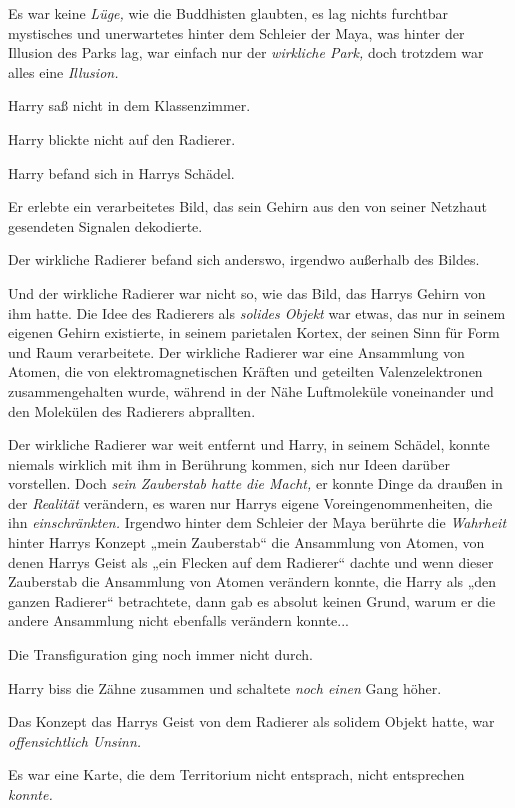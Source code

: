 {Es war keine \emph{Lüge,} wie die Buddhisten glaubten, es lag nichts furchtbar mystisches und unerwartetes hinter dem Schleier der Maya, was hinter der Illusion des Parks lag, war einfach nur der \emph{wirkliche Park,} doch trotzdem war alles eine \emph{Illusion.}

Harry saß nicht in dem Klassenzimmer.

Harry blickte nicht auf den Radierer.

Harry befand sich in Harrys Schädel.

Er erlebte ein verarbeitetes Bild, das sein Gehirn aus den von seiner Netzhaut gesendeten Signalen dekodierte.

Der wirkliche Radierer befand sich anderswo, irgendwo außerhalb des Bildes.

Und der wirkliche Radierer war nicht so, wie das Bild, das Harrys Gehirn von ihm hatte. Die Idee des Radierers als \emph{solides Objekt} war etwas, das nur in seinem eigenen Gehirn existierte, in seinem parietalen Kortex, der seinen Sinn für Form und Raum verarbeitete. Der wirkliche Radierer war eine Ansammlung von Atomen, die von elektromagnetischen Kräften und geteilten Valenzelektronen zusammengehalten wurde, während in der Nähe Luftmoleküle voneinander und den Molekülen des Radierers abprallten.

Der wirkliche Radierer war weit entfernt und Harry, in seinem Schädel, konnte niemals wirklich mit ihm in Berührung kommen, sich nur Ideen darüber vorstellen. Doch \emph{sein Zauberstab hatte die Macht,} er konnte Dinge da draußen in der \emph{Realität} verändern, es waren nur Harrys eigene Voreingenommenheiten, die ihn \emph{einschränkten.} Irgendwo hinter dem Schleier der Maya berührte die \emph{Wahrheit} hinter Harrys Konzept „mein Zauberstab“ die Ansammlung von Atomen, von denen Harrys Geist als „ein Flecken auf dem Radierer“ dachte und wenn dieser Zauberstab die Ansammlung von Atomen verändern konnte, die Harry als „den ganzen Radierer“ betrachtete, dann gab es absolut keinen Grund, warum er die andere Ansammlung nicht ebenfalls verändern konnte...

Die Transfiguration ging noch immer nicht durch.

Harry biss die Zähne zusammen und schaltete \emph{noch einen} Gang höher.

Das Konzept das Harrys Geist von dem Radierer als solidem Objekt hatte, war \emph{offensichtlich Unsinn.}

Es war eine Karte, die dem Territorium nicht entsprach, nicht entsprechen \emph{konnte.}

}
